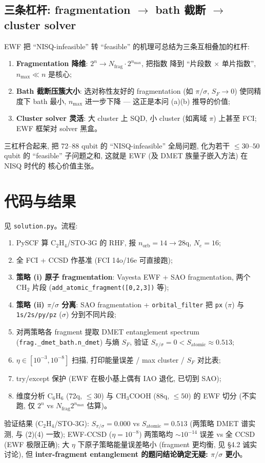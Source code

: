 \documentclass[11pt]{article}
\newcommand{\sig}{\sigma}
\begin{document}
\subsection{三条杠杆: fragmentation $\to$ bath 截断 $\to$ cluster solver}
EWF 把 ``NISQ-infeasible'' 转 ``feasible'' 的机理可总结为三条互相叠加的杠杆:
\begin{enumerate}
  \item \textbf{Fragmentation 降维}: $2^n\to N_{\text{frag}}\cdot2^{n_{\max}}$, 把指数
        降到 ``片段数 $\times$ 单片指数'', $n_{\max}\ll n$ 是核心;
  \item \textbf{Bath 截断压簇大小}: 选对称性友好的 fragmentation (如 $\pi/\sig$,
        $S_F\!\to\!0$) 使同精度下 bath 最小, $n_{\max}$ 进一步下降 --- 这正是本问
        (a)(b) 推导的价值;
  \item \textbf{Cluster solver 灵活}: 大 cluster 上 SQD, 小 cluster (如离域 $\pi$)
        上甚至 FCI; EWF 框架对 solver 黑盒。
\end{enumerate}
三杠杆合起来, 把 72--88 qubit 的 ``NISQ-infeasible'' 全局问题, 化为若干 $\le30$--$50$
qubit 的 ``feasible'' 子问题之和, 这就是 EWF (及 DMET 族量子嵌入方法) 在 NISQ 时代的
核心价值主张。

\section*{代码与结果}
见 \texttt{solution.py}。流程:
\begin{enumerate}
  \item PySCF 算 C$_2$H$_4$/STO-3G 的 RHF, 报 $n_{\text{orb}}{=}14\to28$q, $N_e{=}16$;
  \item 全 FCI + CCSD 作基准 (FCI 14o/16e 可直接跑);
  \item \textbf{策略 (i) 原子 fragmentation}: Vayesta EWF + SAO fragmentation, 两个 CH$_2$
        片段 (\texttt{add\_atomic\_fragment([0,2,3])} 等);
  \item \textbf{策略 (ii) $\pi/\sig$ 分离}: SAO fragmentation + \texttt{orbital\_filter}
        把 \texttt{px} ($\pi$) 与 \texttt{1s/2s/py/pz} ($\sig$) 分到不同片段;
  \item 对两策略各 fragment 提取 DMET entanglement spectrum
        (\texttt{frag.\_dmet\_bath.n\_dmet}) 与熵 $S_F$, 验证 $S_{\pi/\sig}{=}0 <
        S_{\text{atomic}}{\approx}0.513$;
  \item $\eta\in[10^{-3},10^{-8}]$ 扫描, 打印能量误差 / max cluster / $S_F$ 对比表;
  \item try/except 保护 (EWF 在极小基上偶有 IAO 退化, 已切到 SAO);
  \item 维度分析 C$_6$H$_6$ (72q, $\le30$) 与 CH$_3$COOH (88q, $\le50$) 的 EWF 切分
        (不实跑, 仅 $2^n$ vs $N_{\text{frag}}2^{n_{\max}}$ 估算)。
\end{enumerate}
验证结果 (C$_2$H$_4$/STO-3G):
$S_{\pi/\sig}=0.000$ vs $S_{\text{atomic}}=0.513$ (两策略 DMET 谱实测, 与 (2)(4) 一致);
EWF-CCSD ($\eta{=}10^{-8}$) 两策略均 $\sim10^{-14}$ 误差 vs 全 CCSD (EWF 极限正确);
大 $\eta$ 下原子策略能量误差略小 (fragment 更均衡, 见 \S4.2 诚实讨论), 但
\textbf{inter-fragment entanglement 的题问结论确定无疑: $\pi/\sig$ 更小}。
\end{document}

